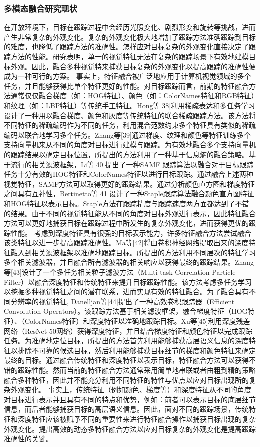 \documentclass[a4paper,zihao=-4]{article}
\begin{document}
\subsubsection{多模态融合研究现状}
在开放环境下，目标在跟踪过程中会经历光照变化、剧烈形变和旋转等挑战，进而产生非常复杂的外观变化。复杂的外观变化极大地增加了跟踪方法准确跟踪到目标的难度，也降低了跟踪方法的准确性。怎样应对目标复杂的外观变化直接决定了跟踪方法的性能。研究表明，单一的视觉特征无法在复杂的跟踪场景下有效地建模目标外观。因此，融合多种视觉特来捕获目标复杂的外观变化以提高跟踪的准确性便成为一种可行的方案。
事实上，特征融合被广泛地应用于计算机视觉领域的多个任务，并且能够获得比单个特征更好的性能。对目标跟踪而言，前期的特征融合方法通常仅仅融合梯度（如：HOG特征）、颜色（如：ColorNames特征和RGB特征）和纹理（如：LBP特征）等传统手工特征。Hong等[38]利用稀疏表达和多任务学习设计了一种用以融合梯度、颜色和灰度等传统特征的联合稀疏跟踪方法。该方法将不同特征的稀疏编码作为不同的任务，利用混合范数约束多个特征具有类似的稀疏编码以联合地学习多个任务。Zhang等[39]通过梯度、纹理和颜色等特征训练多个支持向量机来从不同的角度对目标进行建模与跟踪。为有效地融合多个支持向量机的跟踪结果以确定目标位置，所提出的方法利用了一种基于信息熵的融合策略。基于流行的相关滤波框架，Li等[40]提出了一种SAMF 跟踪算法以融合对于目标跟踪任务十分有效的HOG特征和ColorNames特征以进行目标跟踪。通过融合上述两种视觉特征，SAMF方法可以取得更好的跟踪结果。通过分析颜色直方图和梯度特征之间具有互补性，Bertinetto等[41]设计了一种Staple跟踪算法融合颜色直方图特征和HOG特征以表示目标。Staple方法在跟踪精度与跟踪速度两方面都达到了不错的结果。由于不同的视觉特征能从不同的角度对目标外观进行表示，因此特征融合方法可以更好地捕获目标在跟踪过程中所发生的复杂外观变化，进而获得更优的跟踪性能。
考虑到深度特征具有很强的目标表示能力，许多特征融合方法尝试融合该类特征以进一步提高跟踪准确性。Ma等[42]将由卷积神经网络提取出来的深度特征融入到相关滤波框架以准确地跟踪目标。所提出的方法利用不同层次的特征学习多个相关滤波器，并且融合所有滤波器的相关响应以获得最终的跟踪结果。Zhang等[43]设计了一个多任务相关粒子滤波方法（Multi-task Correlation Particle Filter）以融合深度特征和传统特征来提升目标跟踪性能。该方法考虑多任务学习以挖掘多种视觉特征之间的潜在联系，进而实现有效的特征融合。为了融合具有不同分辨率的视觉特征, Danelljan等[44]提出了一种高效卷积跟踪器（Efficient Convolution Operators）。该跟踪方法基于相关滤波框架，融合梯度特征（HOG特征）、（ColorNames特征）和深度特征以准确地跟踪目标。Xu等[45]利用深度残差网络（ResNet-50网络）获得深度特征，并且结合梯度特征和颜色特征以完成跟踪任务。为准确地定位目标，所提出的方法首先利用能够捕获高层语义信息的深度特征以排除不可靠的候选目标，然后利用能够捕获目标细节的梯度和颜色特征来确定最终的目标。通过融合传统特征和深度特征以表示目标，特征融合方法可以获得不错的跟踪性能。然而当前的特征融合方法通常采用简单地串联或者由粗到精的策略融合多种特征，因此并不能充分利用不同特征的特性与优点以应对目标出现所的复杂外观变化。
事实上，传统特征（例如颜色、梯度等）和深度特征从不同的角度对目标进行表示并且具有不同的特点和优势，例如：前者可以表示目标的底层细节信息，而后者能够捕获目标的高层语义信息。因此，面对不同的跟踪场景，传统特征和深度特征应该被赋予不同的重要性来进行特征融合操作以捕获目标出现的复杂外观变化。提出高效的动态多特征融合方法以应对目标复杂的外观变化是提高跟踪准确性的关键。
\end{document}
